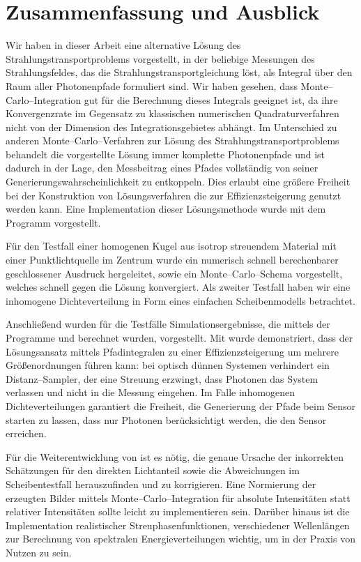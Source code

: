 \chapter{Zusammenfassung und Ausblick}
	Wir haben in dieser Arbeit eine alternative Lösung des Strahlungstransportproblems vorgestellt, in der beliebige Messungen des Strahlungsfeldes, das die Strahlungstransportgleichung löst, als Integral über den Raum aller Photonenpfade formuliert sind. Wir haben gesehen, dass Monte--Carlo--Integration gut für die Berechnung dieses Integrals geeignet ist, da ihre Konvergenzrate im Gegensatz zu klassischen numerischen Quadraturverfahren nicht von der Dimension des Integrationsgebietes abhängt. Im Unterschied zu anderen Monte--Carlo--Verfahren zur Lösung des Strahlungstransportproblems behandelt die vorgestellte Lösung immer komplette Photonenpfade und ist dadurch in der Lage, den Messbeitrag eines Pfades vollständig von seiner Generierungswahrscheinlichkeit zu entkoppeln. Dies erlaubt eine größere Freiheit bei der Konstruktion von Lösungsverfahren die zur Effizienzsteigerung genutzt werden kann.
	Eine Implementation dieser Lösungsmethode wurde mit dem Programm \pirate vorgestellt.
	
	Für den Testfall einer homogenen Kugel aus isotrop streuendem Material mit einer Punktlichtquelle im Zentrum wurde ein numerisch schnell berechenbarer geschlossener Ausdruck hergeleitet, sowie ein Monte--Carlo--Schema vorgestellt, welches schnell gegen die Lösung konvergiert. Als zweiter Testfall haben wir eine inhomogene Dichteverteilung in Form eines einfachen Scheibenmodells betrachtet.

	Anschließend wurden für die Testfälle Simulationsergebnisse, die mittels der Programme \mctd und \pirate berechnet wurden, vorgestellt.
	Mit \pirate wurde demonstriert, dass der Lösungsansatz mittels Pfadintegralen zu einer Effizienzsteigerung um mehrere Größenordnungen führen kann: bei optisch dünnen Systemen verhindert ein Distanz--Sampler, der eine Streuung erzwingt, dass Photonen das System verlassen und nicht in die Messung eingehen. Im Falle inhomogenen Dichteverteilungen garantiert die Freiheit, die Generierung der Pfade beim Sensor starten zu lassen, dass nur Photonen berücksichtigt werden, die den Sensor erreichen.
	
	Für die Weiterentwicklung von \pirate ist es nötig, die genaue Ursache der inkorrekten Schätzungen für den direkten Lichtanteil sowie die Abweichungen im Scheibentestfall herauszufinden und zu korrigieren. Eine Normierung der erzeugten Bilder mittels Monte--Carlo--Integration für absolute Intensitäten statt relativer Intensitäten sollte leicht zu implementieren sein. Darüber hinaus ist die Implementation realistischer Streuphasenfunktionen, verschiedener Wellenlängen zur Berechnung von spektralen Energieverteilungen wichtig, um in der Praxis von Nutzen zu sein. 
	
